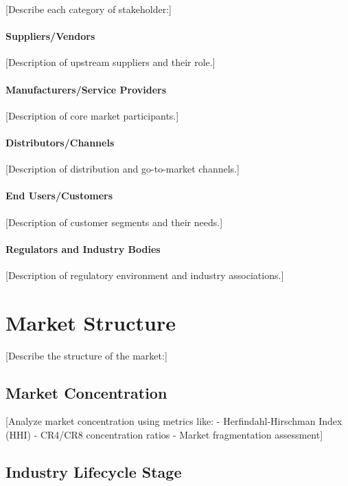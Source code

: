 \documentclass[11pt,letterpaper]{report}
\begin{document}
[Describe each category of stakeholder:]

\paragraph{Suppliers/Vendors}
[Description of upstream suppliers and their role.]

\paragraph{Manufacturers/Service Providers}
[Description of core market participants.]

\paragraph{Distributors/Channels}
[Description of distribution and go-to-market channels.]

\paragraph{End Users/Customers}
[Description of customer segments and their needs.]

\paragraph{Regulators and Industry Bodies}
[Description of regulatory environment and industry associations.]

\section{Market Structure}


[Describe the structure of the market:]

\subsection{Market Concentration}

[Analyze market concentration using metrics like:
- Herfindahl-Hirschman Index (HHI)
- CR4/CR8 concentration ratios
- Market fragmentation assessment]

\subsection{Industry Lifecycle Stage}
\end{document}
